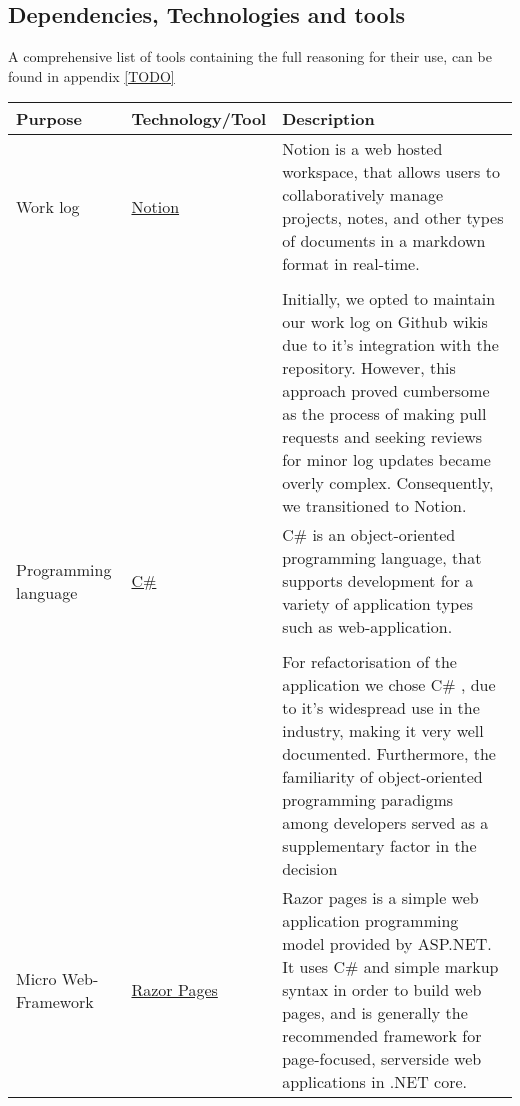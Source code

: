 \subsection{Dependencies, Technologies and tools}


A comprehensive list of tools containing the full reasoning for their use, can be found in appendix \ref{TODO}

\begin{table}[h]
    \centering
    \begin{tabular}{|p{}|p{} | p{}|}
        \hline
        \textbf{Purpose} & \textbf{Technology/Tool} & \textbf{Description}\\
        \hline
         Work log & \href{https://www.notion.so/help/guides/category/documentation}{Notion} & Notion is a web hosted workspace, that allows users to collaboratively manage projects, notes, and other types of documents in a markdown format in real-time.\\
         &&\\
         && Initially, we opted to maintain our work log on Github wikis due to it's integration with the repository. However, this approach proved cumbersome as the process of making pull requests and seeking reviews for minor log updates became overly complex. Consequently, we transitioned to Notion.\\ 
         \hline
         Programming language & \href{https://learn.microsoft.com/en-us/dotnet/csharp/}{C\#} &
         C\#  is an object-oriented programming language, that supports development for a variety of application types such as web-application.\\
         && \\
         && For refactorisation of the application we chose C\# , due to it's widespread use in the industry, making it very well documented. Furthermore, the familiarity of object-oriented programming paradigms among developers served as a supplementary factor in the decision\\
         \hline
         Micro Web-Framework & \href{https://learn.microsoft.com/en-us/aspnet/core/razor-pages/?view=aspnetcore-8.0&tabs=visual-studio}{Razor Pages} & Razor pages is a simple web application programming model provided by ASP.NET. It uses C\# and simple markup syntax in order to build web pages, and is generally the recommended framework for page-focused, serverside web applications in .NET core.\\

\end{tabular}
\end{table}
